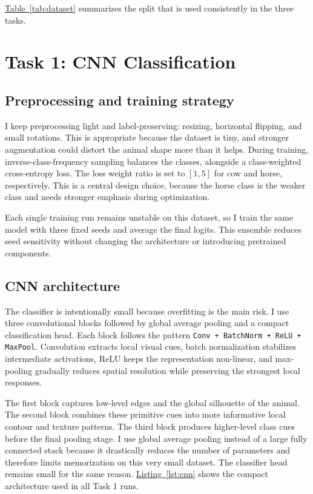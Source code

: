 \documentclass[conference]{IEEEtran}
\newcommand{\tabref}[1]{\hyperref[#1]{Table~\ref*{#1}}}
\newcommand{\lstrefx}[1]{\hyperref[#1]{Listing~\ref*{#1}}}
\begin{document}
\begin{table}[H]
\centering
\caption{Dataset split summary.}
\label{tab:dataset}

\end{table}

\tabref{tab:dataset} summarizes the split that is used consistently in the three tasks.

\section{Task 1: CNN Classification}\label{sec:task1}
\subsection{Preprocessing and training strategy}
I keep preprocessing light and label-preserving: resizing, horizontal flipping, and small rotations. This is appropriate because the dataset is tiny, and stronger augmentation could distort the animal shape more than it helps. During training, inverse-class-frequency sampling balances the classes, alongside a class-weighted cross-entropy loss. The loss weight ratio is set to \([1, 5]\) for cow and horse, respectively. This is a central design choice, because the horse class is the weaker class and needs stronger emphasis during optimization.

Each single training run remains unstable on this dataset, so I train the same model with three fixed seeds and average the final logits. This ensemble reduces seed sensitivity without changing the architecture or introducing pretrained components.

\subsection{CNN architecture}
The classifier is intentionally small because overfitting is the main risk. I use three convolutional blocks followed by global average pooling and a compact classification head. Each block follows the pattern \texttt{Conv + BatchNorm + ReLU + MaxPool}. Convolution extracts local visual cues, batch normalization stabilizes intermediate activations, ReLU keeps the representation non-linear, and max-pooling gradually reduces spatial resolution while preserving the strongest local responses.

The first block captures low-level edges and the global silhouette of the animal. The second block combines these primitive cues into more informative local contour and texture patterns. The third block produces higher-level class cues before the final pooling stage. I use global average pooling instead of a large fully connected stack because it drastically reduces the number of parameters and therefore limits memorization on this very small dataset. The classifier head remains small for the same reason. \lstrefx{lst:cnn} shows the compact architecture used in all Task 1 runs.
\end{document}
